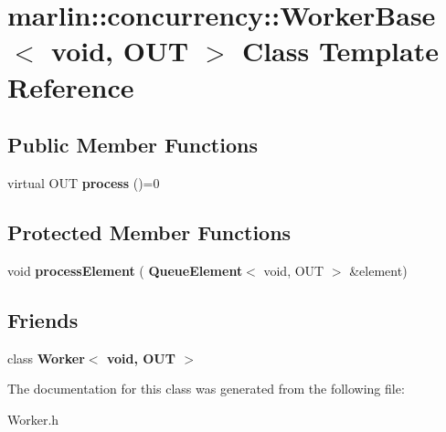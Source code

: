 \section{marlin\+:\+:concurrency\+:\+:Worker\+Base$<$ void, O\+UT $>$ Class Template Reference}
\label{classmarlin_1_1concurrency_1_1WorkerBase_3_01void_00_01OUT_01_4}
\subsection*{Public Member Functions}
\begin{DoxyCompactItemize}
\item 
\mbox{\label{classmarlin_1_1concurrency_1_1WorkerBase_3_01void_00_01OUT_01_4_a625081bfd8f7e3f1533a8db20324a1a8}} 
virtual O\+UT {\bfseries process} ()=0
\end{DoxyCompactItemize}
\subsection*{Protected Member Functions}
\begin{DoxyCompactItemize}
\item 
\mbox{\label{classmarlin_1_1concurrency_1_1WorkerBase_3_01void_00_01OUT_01_4_a42e0441da0a00b2dcda52ebf1c207f51}} 
void {\bfseries process\+Element} (\textbf{ Queue\+Element}$<$ void, O\+UT $>$ \&element)
\end{DoxyCompactItemize}
\subsection*{Friends}
\begin{DoxyCompactItemize}
\item 
\mbox{\label{classmarlin_1_1concurrency_1_1WorkerBase_3_01void_00_01OUT_01_4_a8232f4ec8f7f38b86d1a1487c8a974cf}} 
class {\bfseries Worker$<$ void, O\+U\+T $>$}
\end{DoxyCompactItemize}


The documentation for this class was generated from the following file\+:\begin{DoxyCompactItemize}
\item 
Worker.\+h\end{DoxyCompactItemize}
